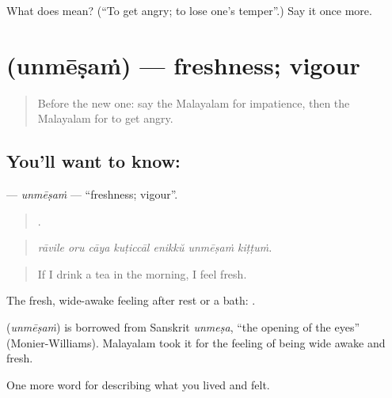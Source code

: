 \begin{tcolorbox}[breakable,colback=teal!4,colframe=teal!35!black,title={Before you move on}]
What does  mean? (\textquotedblleft{}To get angry; to lose one's temper\textquotedblright{}.) Say it once more.
\end{tcolorbox}
\section[\texorpdfstring{\ml{ഉന്മേഷം} (unmēṣaṁ)}{ഉന്മേഷം (unmēṣaṁ)}]{ (unmēṣaṁ) — freshness; vigour}

\label{lesson:ML-C522-unmesam}



\begin{quote}
Before the new one: say the Malayalam for impatience, then the Malayalam for to get angry.
\end{quote}

\subsection*{You'll want to know: }
\textbf{} — \emph{unmēṣaṁ} — \textquotedblleft{}freshness; vigour\textquotedblright{}.

\begin{quote}
      .
\end{quote}

\begin{quote}
\emph{rāvile oru cāya kuṭiccāl enikkŭ unmēṣaṁ kiṭṭuṁ.}
\end{quote}

\begin{quote}
If I drink a tea in the morning, I feel fresh.
\end{quote}

The fresh, wide-awake feeling after rest or a bath:    .

\begin{cousinweb}
\textbf{} (\emph{unmēṣaṁ}) is borrowed from Sanskrit \emph{unmeṣa}, \textquotedblleft{}the opening of the eyes\textquotedblright{} (Monier-Williams). Malayalam took it for the feeling of being wide awake and fresh.
\end{cousinweb}

\begin{grammarlens}[title={What you've built}]
One more word for describing what you lived and felt.
\end{grammarlens}

